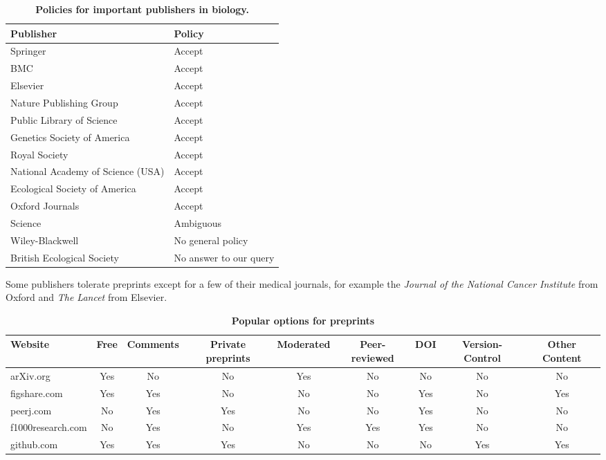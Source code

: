 \documentclass[10pt]{article}
\begin{document}
\begin{table}[!ht]
    \caption{\bf{Policies for important publishers in biology.}}
    \begin{tabular}{|ll|}
    \hline
    Publisher                                   & Policy \\
    \hline
    Springer                            	& Accept \\
    BMC                                 	& Accept \\
    Elsevier                            	& Accept \\
    Nature Publishing Group             	& Accept \\
    Public Library of Science           	& Accept \\
    Genetics Society of America                 & Accept \\
    Royal Society                       	& Accept \\
    National Academy of Science (USA)           & Accept \\
    Ecological Society of America       	& Accept \\
    Oxford Journals                             & Accept \\
    Science                             	& Ambiguous \\
    Wiley-Blackwell                       	& No general policy \\
    British Ecological Society                  & No answer to our query \\
    \hline
    \end{tabular}
    \begin{flushleft} Some publishers tolerate preprints except for a few of
their medical journals, for example the \emph{ Journal of the National Cancer
Institute} from Oxford and \emph{The Lancet} from Elsevier.  \end{flushleft}
    \label{table:policies}
\end{table}

\begin{table}[!ht]
    \caption{\bf{Popular options for preprints}}
    \begin{tabular}{|l|cccccccc|}
    \hline
    Website               & Free & Comments & Private preprints & Moderated & Peer-reviewed & DOI & Version-Control & Other Content\\
    \hline
    arXiv.org             & Yes & No & No & Yes & No & No & No & No\\
    figshare.com          & Yes & Yes & No & No & No & Yes & No & Yes\\
    peerj.com             & No & Yes & Yes & No & No & Yes & No & No\\
    f1000research.com     & No & Yes & No & Yes & Yes & Yes & No & No\\
    github.com            & Yes & Yes & Yes & No & No & No & Yes & Yes\\
    \hline
    \end{tabular}
    \label{table:box1}
\end{table}
\end{document}
